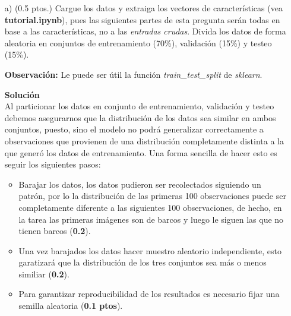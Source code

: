\documentclass[11pt,letterpaper]{article}
\begin{document}
\begin{enumerate}

\item[a)](0.5 ptos.) Cargue los datos y extraiga los vectores de características (vea \textbf{tutorial.ipynb}), pues las siguientes partes de esta pregunta serán todas en base a las características, no a las  \emph{entradas crudas}. Divida los datos de forma aleatoria en conjuntos de entrenamiento (70\%), validación (15\%) y testeo (15\%). 

\textbf{Observación:} Le puede ser útil la función \textit{train\_test\_split} de \textit{sklearn}.

\textbf{Solución}\\

Al particionar los datos en conjunto de entrenamiento, validación y testeo debemos asegurarnos que la distribución de los datos sea similar en ambos conjuntos, puesto, sino el modelo no podrá generalizar correctamente a observaciones que provienen de una distribución completamente distinta a la que generó los datos de entrenamiento. Una forma sencilla de hacer esto es seguir los siguientes pasos:

\begin{itemize}
    \item Barajar los datos, los datos pudieron ser recolectados siguiendo un patrón, por lo la distribución de las primeras 100 observaciones puede ser completamente diferente a las siguientes 100 observaciones, de hecho, en la tarea las primeras imágenes son de barcos y luego le siguen las que no tienen barcos (\textbf{0.2}).
    \item Una vez barajados los datos hacer muestro aleatorio independiente, esto garatizará que la distribución de los tres conjuntos sea más o menos similiar (\textbf{0.2}).
    \item Para garantizar reproducibilidad de los resultados es necesario fijar una semilla aleatoria (\textbf{0.1 ptos}).
\end{itemize}


\end{enumerate}
\end{document}
